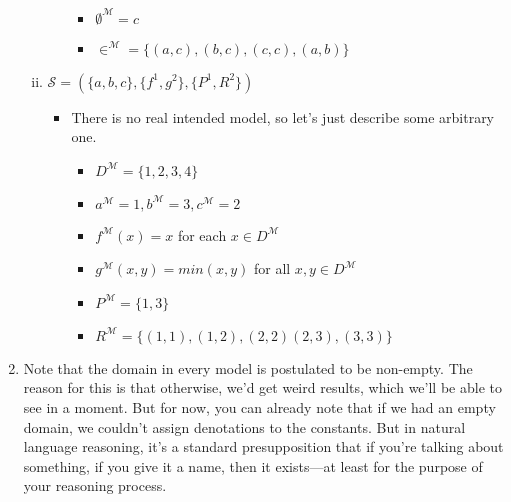 \begin{enumerate}[\thesection.1]
\begin{enumerate}[(i)]
\begin{enumerate}[(a)]
\begin{itemize}
						\item $\emptyset^\mathcal{M}=c$
						
						\item $\in^\mathcal{M}=\{(a,c), (b,c), (c,c), (a,b)\}$
						
					\end{itemize}
					
					
				\end{enumerate}
			
			
				\item $\mathcal{S}=(\{a,b,c\}, \{f^1, g^2\}, \{P^1, R^2\})$
							
					\begin{itemize}
					
						\item There is no real intended model, so let's just describe some arbitrary one.
						
						\begin{itemize}
						
							\item $D^\mathcal{M}=\{1,2,3,4\}$
							
							\item $a^\mathcal{M}=1, b^\mathcal{M}=3, c^\mathcal{M}=2$
						
							\item $f^\mathcal{M}(x)=x$ for each $x\in D^\mathcal{M}$
							
							\item $g^\mathcal{M}(x,y)=min(x,y)$ for all $x,y\in D^\mathcal{M}$
							
							\item $P^\mathcal{M}=\{1,3\}$
							
							\item $R^\mathcal{M}=\{(1,1), (1,2),(2,2) (2,3), (3,3)\}$
						
						\end{itemize}
						
						
					
					\end{itemize}		
							
			\end{enumerate}		
			
			\item \label{fo_sem_empty} Note that the domain in every model is postulated to be non-empty. The reason for this is that otherwise, we'd get weird results, which we'll be able to see in a moment. But for now, you can already note that if we had an empty domain, we couldn't assign denotations to the constants. But in natural language reasoning, it's a standard presupposition that if you're talking about something, if you give it a name, then it exists---at least for the purpose of your reasoning process. 
	

\end{enumerate}
